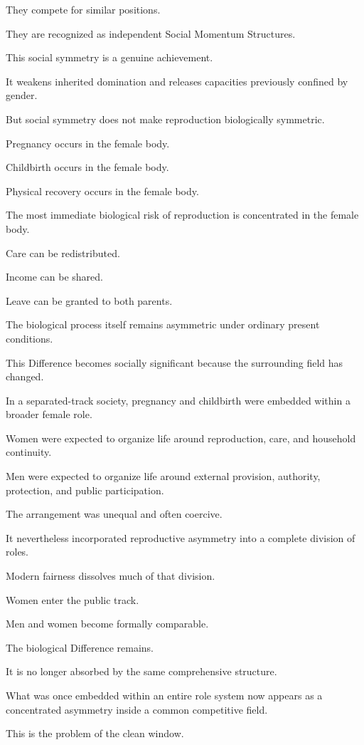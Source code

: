 They compete for similar positions.

They are recognized as independent Social Momentum Structures.

This social symmetry is a genuine achievement.

It weakens inherited domination and releases capacities previously confined by gender.

But social symmetry does not make reproduction biologically symmetric.

Pregnancy occurs in the female body.

Childbirth occurs in the female body.

Physical recovery occurs in the female body.

The most immediate biological risk of reproduction is concentrated in the female body.

Care can be redistributed.

Income can be shared.

Leave can be granted to both parents.

The biological process itself remains asymmetric under ordinary present conditions.

This Difference becomes socially significant because the surrounding field has changed.

In a separated-track society, pregnancy and childbirth were embedded within a broader female role.

Women were expected to organize life around reproduction, care, and household continuity.

Men were expected to organize life around external provision, authority, protection, and public participation.

The arrangement was unequal and often coercive.

It nevertheless incorporated reproductive asymmetry into a complete division of roles.

Modern fairness dissolves much of that division.

Women enter the public track.

Men and women become formally comparable.

The biological Difference remains.

It is no longer absorbed by the same comprehensive structure.

What was once embedded within an entire role system now appears as a concentrated asymmetry inside a common competitive field.

This is the problem of the clean window.

